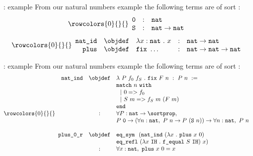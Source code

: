\begin{frame}{\gallina: example}
From our natural numbers example the following terms are of sort \sortset:
$$
	\rowcolors{0}{}{}
	\begin{array}{rcl}
		\texttt{0} & : & \texttt{nat} \\
		\texttt{S} & : & \texttt{nat} \rightarrow \texttt{nat}
	\end{array}
$$
$$
	\rowcolors{0}{}{}
	\begin{array}{rclcl}
		\texttt{nat\_id} & \objdef & \lambda x : \texttt{nat}~.~x & : & \texttt{nat} \rightarrow \texttt{nat} \\
		\texttt{plus} & \objdef & \texttt{fix}~\ldots & : & \texttt{nat} \rightarrow \texttt{nat} \rightarrow \texttt{nat} \\
	\end{array}
$$
\end{frame}

\begin{frame}{\gallina: example}
From our natural numbers example the following terms are of sort \sortprop:
$$
	\rowcolors{0}{}{}
	\begin{array}{rcl}
		\texttt{nat\_ind} & \objdef & \lambda~P~f_0~f_S ~.~ \texttt{fix}~F~n ~:~ P~n ~:= \\
			&   &  \texttt{match}~ n ~\texttt{with} \\
			&   &  ~~| ~0 => f_0 \\
			&	&  ~~| ~S~m => f_S~m~(F~m) \\
			&	&  \texttt{end} \\
			& : &  \forall P : \texttt{nat} \rightarrow \sortprop,\\
			&   & P~\texttt{0} \rightarrow (\forall n : \texttt{nat},~ P~n \rightarrow P~(\texttt{S}~n)) \rightarrow \forall n : \texttt{nat},~ P~n \\
		\\
		\texttt{plus\_0\_r} & \objdef & \texttt{eq\_sym}
							~~(\texttt{nat\_ind}~(\lambda x~.~\texttt{plus}~x~0)\\
							& & \texttt{eq\_refl}~(\lambda x~\texttt{IH}~.~\texttt{f\_equal}~S~\texttt{IH})~x) \\
							& : & \forall x : \texttt{nat},~ \texttt{plus}~x~0 = x \\
	\end{array}
$$
\end{frame}

